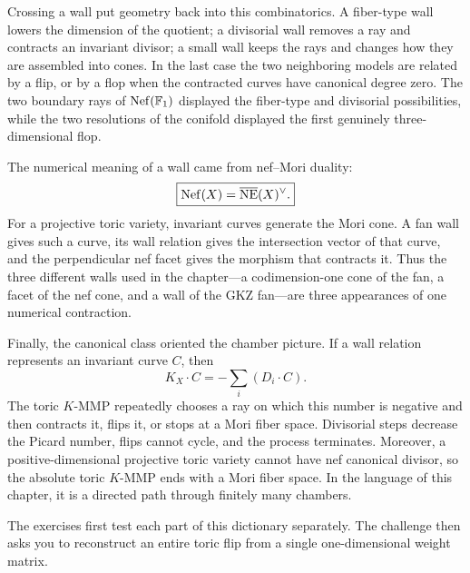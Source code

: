 Crossing a wall put geometry back into this combinatorics.  A
fiber-type wall lowers the dimension of the quotient; a divisorial
wall removes a ray and contracts an invariant divisor; a small wall
keeps the rays and changes how they are assembled into cones.  In the
last case the two neighboring models are related by a flip, or by a
flop when the contracted curves have canonical degree zero.  The two
boundary rays of \(\operatorname{Nef}(\mathbb F_1)\) displayed the fiber-type and
divisorial possibilities, while the two resolutions of the conifold
displayed the first genuinely three-dimensional flop.

The numerical meaning of a wall came from nef--Mori duality:
\[
\boxed{
\operatorname{Nef}(X)=\overline{\operatorname{NE}}(X)^\vee.}
\]
For a projective toric variety, invariant curves generate the Mori
cone.  A fan wall gives such a curve, its wall relation gives the
intersection vector of that curve, and the perpendicular nef facet
gives the morphism that contracts it.  Thus the three different walls
used in the chapter---a codimension-one cone of the fan, a facet of the
nef cone, and a wall of the GKZ fan---are three appearances of one
numerical contraction.

Finally, the canonical class oriented the chamber picture.  If a wall
relation represents an invariant curve \(C\), then
\[
K_X\cdot C=-\sum_i(D_i\cdot C).
\]
The toric \(K\)-MMP repeatedly chooses a ray on which this number is
negative and then contracts it, flips it, or stops at a Mori fiber
space.  Divisorial steps decrease the Picard number, flips cannot cycle,
and the process terminates.  Moreover, a positive-dimensional
projective toric variety cannot have nef canonical divisor, so the
absolute toric \(K\)-MMP ends with a Mori fiber space.  In the language
of this chapter, it is a directed path through finitely many chambers.

The exercises first test each part of this dictionary separately.  The
challenge then asks you to reconstruct an entire toric flip from a
single one-dimensional weight matrix.

